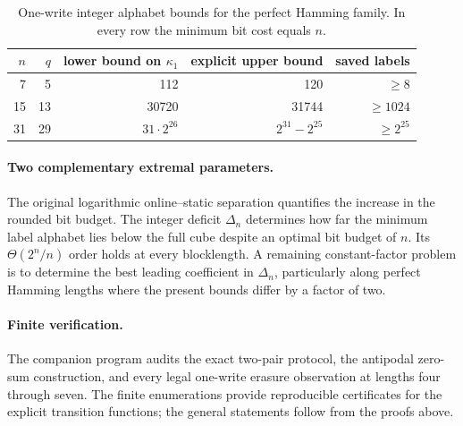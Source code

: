 \begin{table}[ht]\centering\small
\begin{tabular}{@{}rrrrr@{}}\toprule
$n$ & $q$ & lower bound on $\kappa_1$ & explicit upper bound & saved labels\\\midrule
7&5&112&120&$\ge8$\\
15&13&30720&31744&$\ge1024$\\
31&29&$31\cdot2^{26}$&$2^{31}-2^{25}$&$\ge2^{25}$\\\bottomrule
\end{tabular}
\caption{One-write integer alphabet bounds for the perfect Hamming family. In every row the minimum bit cost equals $n$.}\label{tab:v3hamming}
\end{table}

\paragraph{Two complementary extremal parameters.}
The original logarithmic online--static separation quantifies the increase in the rounded bit budget. The integer deficit $\Delta_n$ determines how far the minimum label alphabet lies below the full cube despite an optimal bit budget of $n$. Its $\Theta(2^n/n)$ order holds at every blocklength. A remaining constant-factor problem is to determine the best leading coefficient in $\Delta_n$, particularly along perfect Hamming lengths where the present bounds differ by a factor of two.

\paragraph{Finite verification.}
The companion program  audits the exact two-pair protocol, the antipodal zero-sum construction, and every legal one-write erasure observation at lengths four through seven. The finite enumerations provide reproducible certificates for the explicit transition functions; the general statements follow from the proofs above.

